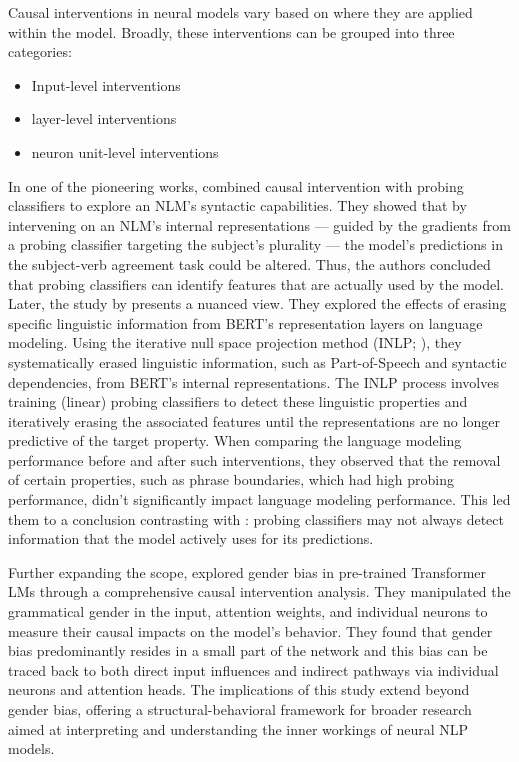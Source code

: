 Causal interventions in neural models vary based on where they are applied within the model. Broadly, these interventions can be grouped into three categories: 
\begin{itemize}
    \item Input-level interventions~\citep{zmigrod-etal-2019-counterfactual,vig2020causal,amini2023naturalistic}
    \item layer-level interventions~
    \item neuron unit-level interventions~\citep{bau2018identifying,lakretz-etal-2019-emergence,vig2020causal,mueller-etal-2022-causal}
\end{itemize}

In one of the pioneering works, \cite{giulianelli-etal-2018-hood} combined causal intervention with probing classifiers to explore an NLM's syntactic capabilities. They showed that by intervening on an NLM's internal representations --- guided by the gradients from a probing classifier targeting the subject's plurality --- the model's predictions in the subject-verb agreement task could be altered. Thus, the authors concluded that probing classifiers can identify features that are actually used by the model. Later, the study by \cite{elazar2021amnesic} presents a nuanced view. They explored the effects of erasing specific linguistic information from BERT's representation layers on language modeling. Using the iterative null space projection method (INLP; \cite{ravfogel-etal-2020-null}), they systematically erased linguistic information, such as Part-of-Speech and syntactic dependencies, from BERT's internal representations. The INLP process involves training (linear) probing classifiers to detect these linguistic properties and iteratively erasing the associated features until the representations are no longer predictive of the target property. When comparing the language modeling performance before and after such interventions, they observed that the removal of certain properties, such as phrase boundaries, which had high probing performance, didn't significantly impact language modeling performance. This led them to a conclusion contrasting with \cite{giulianelli-etal-2018-hood}: probing classifiers may not always detect information that the model actively uses for its predictions. 

Further expanding the scope, \cite{vig2020causal} explored gender bias in pre-trained Transformer LMs through a comprehensive causal intervention analysis. They manipulated the grammatical gender in the input, attention weights, and individual neurons to measure their causal impacts on the model's behavior. They found that gender bias predominantly resides in a small part of the network and this bias can be traced back to both direct input influences and indirect pathways via individual neurons and attention heads. The implications of this study extend beyond gender bias, offering a structural-behavioral framework for broader research aimed at interpreting and understanding the inner workings of neural NLP models.  

